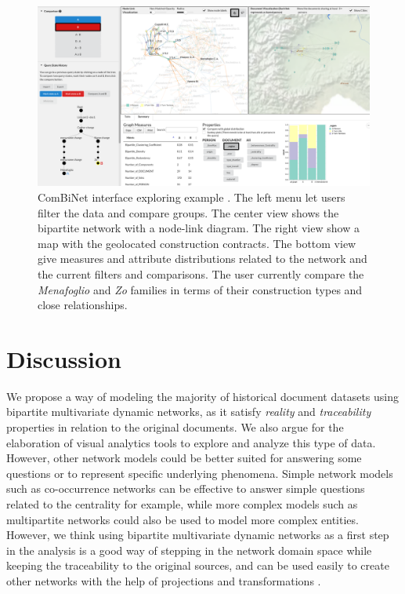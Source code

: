 \documentclass{vgtc}                          %
\newcommand{\modelplural}{bipartite multivariate dynamic networks\xspace}
\begin{document}
\begin{figure}[tb]
 \centering %
 \includegraphics[width=\columnwidth]{Figures/ComBiNet.png}
 \caption{ComBiNet interface exploring example \pascal. The left menu let users filter the data and compare groups. The center view shows the bipartite network with a node-link diagram. The right view show a map with the geolocated construction contracts. The bottom view give measures and attribute distributions related to the network and the current filters and comparisons. 
 The user currently compare the \textit{Menafoglio} and \textit{Zo} families in terms of their construction types and close relationships.}
 \label{fig:combinet}
\end{figure}


\section{Discussion}

We propose a way of modeling the majority of historical document datasets using \modelplural, as it satisfy \textit{reality} and \textit{traceability} properties in relation to the original documents. 
We also argue for the elaboration of visual analytics tools to explore and analyze this type of data. However, other network models could be better suited for answering some questions or to represent specific underlying phenomena. Simple network models such as co-occurrence networks can be effective to answer simple questions related to the centrality for example, while more complex models such as multipartite networks could also be used to model more complex entities.
However, we think using \modelplural as a first step in the analysis is a good way of stepping in the network domain space while keeping the traceability to the original sources, and can be used easily to create other networks with the help of projections and transformations \cite{andrei2011porgy}. 
\end{document}
